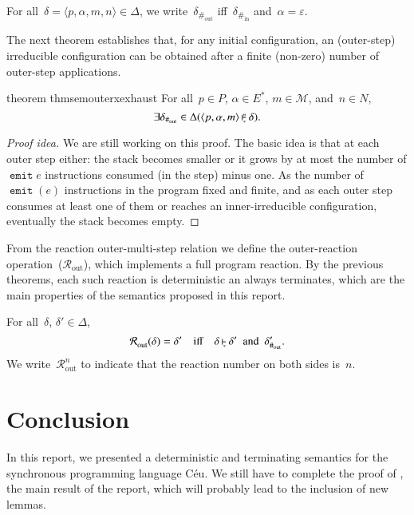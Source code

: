 \documentclass[10pt,a4paper,oneside,leqno]{article}
\makeatletter
\numberwithin{equation}{section}
\def\Ceu{C\'eu}
\let\nil=\varepsilon
\def\<#1>{\langle#1\rangle}
\def\Hinner{{\#_{\mathrm{in}}}}
\def\Houter{{\#_{\mathrm{out}}}}
\newcommand\Router[1][]{{\mathcal{R}_{\mathrm{out}}^{#1}}}
\def\@inner#1#2{%
  \setbox0=\hbox{$\vdash$}%
  \setbox1=\hbox{$\scriptscriptstyle#1$}%
  \setbox2=\hbox{$\scriptscriptstyle#2$}%
  \ifdim\wd1>\wd2
    \setbox2=\hbox to\wd1{\hfil$\scriptscriptstyle#2$\hfil}%
  \else
    \setbox1=\hbox to\wd2{\hfil$\scriptscriptstyle#1$\hfil}%
  \fi
  \setbox3=\hbox{$\null^{\box1}_{\box2}$}%
  \dimen0=.6ex
  \ifdim\wd3>\dimen0
    \dimen0=\wd3
  \fi
  \rlap{\hbox{$\vrule height\the\ht0 depth\the\dp0 width.6pt
      \vcenter{\hrule height.3pt depth.3pt width\dimen0}$}}%
  \kern1pt\box3
}
\newcommand{\inner}[2][]{\mathbin{\@inner{#2}{#1}}}
\newcommand{\innerx}[1]{\inner[\ast]{#1}}
\def\@ceuop#1{\mathop{\texttt{#1}}}%
\def\@ceubin#1{\mathbin{\texttt{#1}}}%
\def\ceu{\protect\@ceu}
\def\@ceu#1{%
  \bgroup
  \def\Skip{\@ceuop{skip}}%
  \def\Mem{\@ceuop{mem}}%
  \def\Attr##1##2{##1\coloneqq##2}%
  \def\Await{\@ceuop{await}}%
  \def\Emit{\@ceuop{emit}}%
  \def\Break{\@ceuop{break}}%
  \def\Ifelse##1##2##3{\@ceuop{if}##1\@ceuop{then}{##2}\@ceuop{else}{##3}}%
  \def\Loop{\@ceuop{loop}}%
  \def\And{\@ceubin{and}}%
  \def\Or{\@ceubin{or}}%
  \def\Fin{\@ceuop{fin}}%
  \def\Awaiting{\@ceuop{@awaiting}}%
  \def\Emitting{\@ceuop{@emitting}}%
  \def\Atloop{\@ceuop{@loop}}%
  \ensuremath{#1}\ignorespaces
  \egroup
}
\makeatother
\begin{document}
\begin{definition}[label={def:sem:outer:irreducible},
  name={Outer-step irreducible configuration}]
  For all~$\delta=\<p,\alpha,m,n>\in\Delta$, we write~$\delta_\Houter$
  iff~$\delta_\Hinner$ and~$\alpha=\nil$.
\end{definition}

The next theorem establishes that, for any initial configuration, an
(outer-step) irreducible configuration can be obtained after a finite
(non-zero) number of outer-step applications.

\begin{restatable}[label={thm:sem:outerx:exhaust}]{theorem}
  {thmsemouterxexhaust}
  For all~$p\in{P}$, $\alpha\in{E^*}$, $m\in\mathcal{M}$, and~$n\in{N}$,
  \[
    \exists\delta_\Houter\in\Delta(\<p,\alpha,m>\innerx{n}\delta).
  \]
\end{restatable}
\begin{proof}[Proof idea]
  We are still working on this proof.  The basic idea is that at each outer
  step either: the stack becomes smaller or it grows by at most the number
  of \ceu{\Emit{e}} instructions consumed (in the step) minus one.  As the
  number of \ceu{\Emit(e)} instructions in the program fixed and finite, and
  as each outer step consumes at least one of them or reaches an
  inner-irreducible configuration, eventually the stack becomes empty.
\end{proof}

From the reaction outer-multi-step relation we define the outer-reaction
operation~($\Router$), which implements a full program reaction.  By the
previous theorems, each such reaction is deterministic an always terminates,
which are the main properties of the semantics proposed in this report.

\begin{definition}[name={Outer reaction},label={def:outer:R}]
  For all~$\delta$, $\delta'\in\Delta$,
  \[
    \Router(\delta)=\delta'
    \quad\text{iff}\quad
    \delta\innerx{}\delta'
    \enspace\text{and}\enspace
    \delta'_\Houter.
  \]
  We write~$\Router[n]$ to indicate that the reaction number on both sides
  is~$n$.
\end{definition}


\section{Conclusion}
\label{sec:final}

In this report, we presented a deterministic and terminating semantics for
the synchronous programming language \Ceu.  We still have to complete the
proof of , the main result of the report, which
will probably lead to the inclusion of new lemmas.
\end{document}
